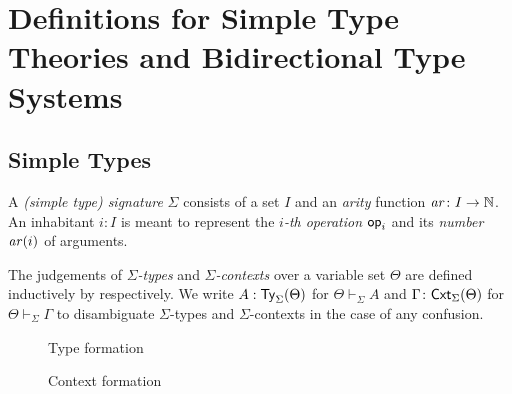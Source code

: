
\section{Definitions for Simple Type Theories and Bidirectional Type Systems}\label{sec:defs}

\subsection{Simple Types}
\begin{definition}
  A \emph{(simple type) signature} $\Sigma$ consists of a set $I$ and an \emph{arity} function $\mathit{ar}\colon I \to \mathbb{N}$.
  An inhabitant $i : I$ is meant to represent the \emph{$i$-th operation} $\mathsf{op}_i$ and its \emph{number} $ \mathit{ar}(i)$ of arguments.

  The judgements of \emph{$\Sigma$-types} and \emph{$\Sigma$-contexts} over a variable set $\Theta$ are defined inductively by  respectively.
We write $A : \mathsf{Ty}_{\Sigma}(\Theta)$ for $\Theta \vdash_{\Sigma} A$ and $\Gamma \colon \mathsf{Cxt}_{\Sigma}(\Theta)$ for $\Theta \vdash_{\Sigma} \Gamma$ to disambiguate $\Sigma$-types and $\Sigma$-contexts in the case of any confusion.
\end{definition}

\begin{figure}
  \begin{minipage}[b]{.55\textwidth}
    \centering
    \small
    \caption{Type formation}
    \label{fig:simple-type}
  \end{minipage}
  \begin{minipage}[b]{.4\textwidth}
    \centering
    \small
    \caption{Context formation}
  \label{fig:simple-context}
  \end{minipage}
\end{figure}

